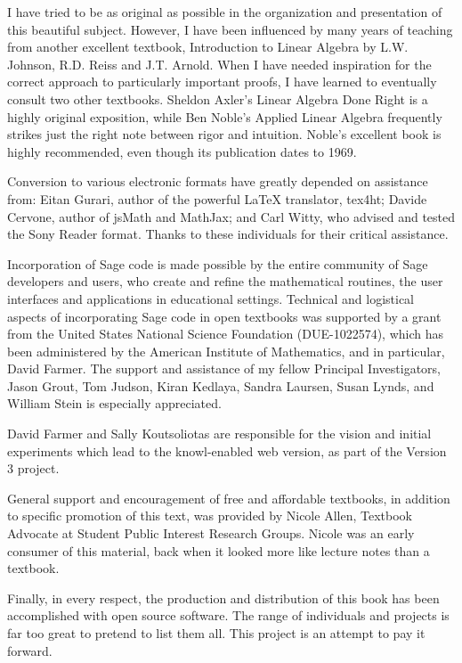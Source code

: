 \documentclass{ximera}
\begin{document}
I have tried to be as original as possible in the organization and
presentation of this beautiful subject. However, I have been
influenced by many years of teaching from another excellent textbook,
Introduction to Linear Algebra by L.W. Johnson, R.D. Reiss and
J.T. Arnold. When I have needed inspiration for the correct approach
to particularly important proofs, I have learned to eventually consult
two other textbooks. Sheldon Axler's Linear Algebra Done Right is a
highly original exposition, while Ben Noble's Applied Linear Algebra
frequently strikes just the right note between rigor and
intuition. Noble's excellent book is highly recommended, even though
its publication dates to 1969.

Conversion to various electronic formats have greatly depended on
assistance from: Eitan Gurari, author of the powerful LaTeX
translator, tex4ht; Davide Cervone, author of jsMath and MathJax; and
Carl Witty, who advised and tested the Sony Reader format. Thanks to
these individuals for their critical assistance.

Incorporation of Sage code is made possible by the entire community of
Sage developers and users, who create and refine the mathematical
routines, the user interfaces and applications in educational
settings. Technical and logistical aspects of incorporating Sage code
in open textbooks was supported by a grant from the United States
National Science Foundation (DUE-1022574), which has been administered
by the American Institute of Mathematics, and in particular, David
Farmer. The support and assistance of my fellow Principal
Investigators, Jason Grout, Tom Judson, Kiran Kedlaya, Sandra Laursen,
Susan Lynds, and William Stein is especially appreciated.

David Farmer and Sally Koutsoliotas are responsible for the vision and
initial experiments which lead to the knowl-enabled web version, as
part of the Version 3 project.

General support and encouragement of free and affordable textbooks, in
addition to specific promotion of this text, was provided by Nicole
Allen, Textbook Advocate at Student Public Interest Research
Groups. Nicole was an early consumer of this material, back when it
looked more like lecture notes than a textbook.

Finally, in every respect, the production and distribution of this
book has been accomplished with open source software. The range of
individuals and projects is far too great to pretend to list them
all. This project is an attempt to pay it forward.
  
\end{document}
